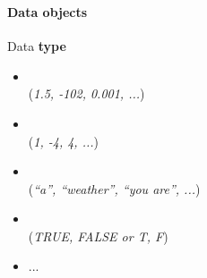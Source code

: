 \documentclass[8pt]{beamer}
\begin{document}
\begin{frame}
\frametitle{\insertsection}
\framesubtitle{Data objects}

Data \textbf{type}
\begin{itemize}[<+(1)->]
\item {\color{blue}{numeric}}   \\(\textit{1.5, -102, 0.001, ...})
\item {\color{blue}{integer}}   \\(\textit{1, -4, 4, ...})
\item {\color{blue}{character}} \\(\textit{``a'', ``weather'', ``you are'', ...})
\item {\color{blue}{logical}}   \\(\textit{TRUE, FALSE or T, F})
\item ...
\end{itemize}




\end{frame}

\end{document}
